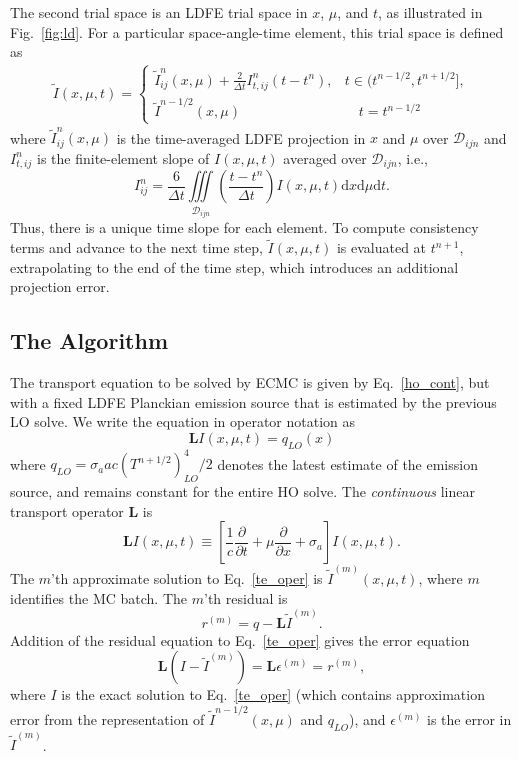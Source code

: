 \documentclass{anstrans}
\newcommand{\pderiv}[2]{\frac{\partial #1}{\partial #2}}
\newcommand{\B}[1]{\ensuremath{\mathbf{#1}}}
\renewcommand{\d}{\mathrm{d}}
\begin{document}
The second trial space is an LDFE trial space in $x$, $\mu$, and $t$, as illustrated in
Fig.~\ref{fig:ld}. For a particular space-angle-time element, this trial space is defined as
\begin{multline}
\tilde I(x,\mu,t) = \left \{ \begin{array}{cl}
    \tilde I_{ij}^n(x,\mu) + \frac{2}{\Delta t}I_{t,ij}^n\left(t-t^{n}\right), &
          t\in (t^{n-1/2},t^{n+1/2}], \\
    \tilde I^{n-1/2}(x,\mu) &  \quad t=t^{n-1/2}
\end{array}
    \right.
\end{multline}
where  $\tilde I_{ij}^n(x,\mu)$ is the time-averaged LDFE projection in $x$ and $\mu$ over
$\mathcal{D}_{ijn}$ and $I^n_{t,ij}$ is the finite-element slope of $I(x,\mu,t)$ averaged over $\mathcal{D}_{ijn}$,
i.e.,
\begin{equation}\label{eq:tslope}
    I_{ij}^n = \frac{6}{\Delta t} \iiint\limits_{\mathcal{D}_{ijn}} \left( \frac{t - t^{n}}{\Delta
    t} \right) I(x,\mu,t) \d x \d \mu \d t.
\end{equation}
Thus, there is a unique time slope for each element. To compute consistency terms and advance to the
next time step, $\tilde
I(x,\mu,t)$ is evaluated at $t^{n+1}$, extrapolating to the end of the time step, which introduces an 
additional projection error. 



\subsection{The Algorithm}

The transport equation to be solved by ECMC is given by Eq.~\eqref{ho_cont}, but with a
fixed LDFE Planckian emission source that is estimated by the previous LO solve.  We write the equation in
operator notation as
\begin{equation}\label{te_oper}
    \B L I(x,\mu,t)  = q_{LO}(x)
\end{equation}
where $q_{LO} = \sigma_a a c \left(T^{n+1/2}\right)^{4}_{LO}/2$ denotes the latest estimate of the
emission source, and remains constant for the entire HO solve. 
The \emph{continuous} linear transport operator $\B L$ is
\begin{equation}\label{L_oper}
   \B L I(x,\mu,t) \equiv \left[ \frac{1}{c}\pderiv{}{t} + \mu \pderiv{}{x} + \sigma_a
    \right] I(x,\mu,t).
\end{equation}
The $m$'th approximate solution to Eq.~\eqref{te_oper} is $\tilde{I}^{(m)}(x,\mu,t)$, where
$m$ identifies the MC batch. The $m$'th residual is 
\begin{equation}\label{eq:res}
r^{(m)} = q - \B L\tilde{I}^{(m)}.
\end{equation}
 Addition
of the residual equation to Eq.~\eqref{te_oper} gives the error equation
\begin{equation}\label{eq:err}
\B L (I - \tilde{I}^{(m)}) = \B L {\epsilon}^{(m)} = r^{(m)},
\end{equation}
where $I$ is the exact solution to Eq.~\eqref{te_oper} (which contains approximation error from the representation of
$\tilde I^{n-1/2}(x,\mu)$ and $q_{LO}$), and ${\epsilon}^{(m)}$ is the error in
$\tilde{I}^{(m)}$. 
\end{document}
